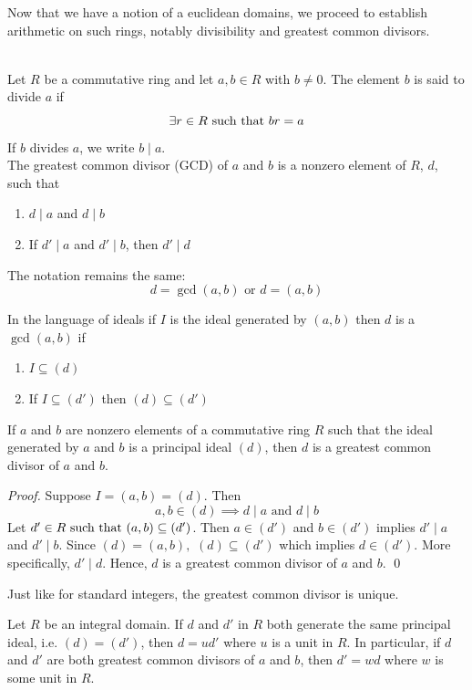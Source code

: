 Now that we have a notion of a euclidean domains, we proceed to establish arithmetic on such rings, notably divisibility and greatest common divisors.

\begin{definition} \leavevmode \\
    Let $R$ be a commutative ring and let $a,b\in R$ with $b\neq 0$. The element $b$ is said to divide $a$ if
    $$\exists r \in R \text{ such that } br = a$$
    If $b$ divides $a$, we write $b \mid a$. \\
    The greatest common divisor (GCD) of $a$ and $b$ is a nonzero element of $R$, $d$, such that 
    \begin{enumerate}
        \item $d \mid a$ and $d \mid b$
        \item If $d' \mid a$ and $d' \mid b$, then $d' \mid d$
    \end{enumerate}
    The notation remains the same:
    $$d=\gcd(a,b) \text{ or } d=(a,b)$$
\end{definition}
In the language of ideals if $I$ is the ideal generated by $(a,b)$ then $d$ is a $\gcd(a,b)$ if 
\begin{enumerate}
    \item $I \subseteq (d)$
    \item If $I \subseteq (d')$ then $(d) \subseteq (d')$
\end{enumerate}

\begin{proposition}
    If $a$ and $b$ are nonzero elements of a commutative ring $R$ such that the ideal generated by $a$ and $b$ is a principal ideal $(d)$, then $d$ is a greatest common divisor of $a$ and $b$.
\end{proposition}

\begin{proof}
    Suppose $I = (a,b) = (d)$. Then
    $$a,b\in (d) \implies d\mid a \text{ and } d \mid b$$
    Let $d'\in R \text{ such that } (a,b) \subseteq (d')$. Then $a \in (d')$ and $b\in (d')$ implies $d' \mid a$ and $d' \mid b$. Since $(d) = (a,b),$ $(d) \subseteq (d')$ which implies $d\in (d')$. More specifically, $d' \mid d$. Hence, $d$ is a greatest common divisor of $a$ and $b$.
    \qed
\end{proof}

Just like for standard integers, the greatest common divisor is unique.

\begin{proposition}
    Let $R$ be an integral domain. If $d$ and $d'$ in $R$ both generate the same principal ideal, i.e. $(d) = (d')$, then $d=ud'$ where $u$ is a unit in $R$. In particular, if $d$ and $d'$ are both greatest common divisors of $a$ and $b$, then $d' = wd$ where $w$ is some unit in $R$.
\end{proposition}

